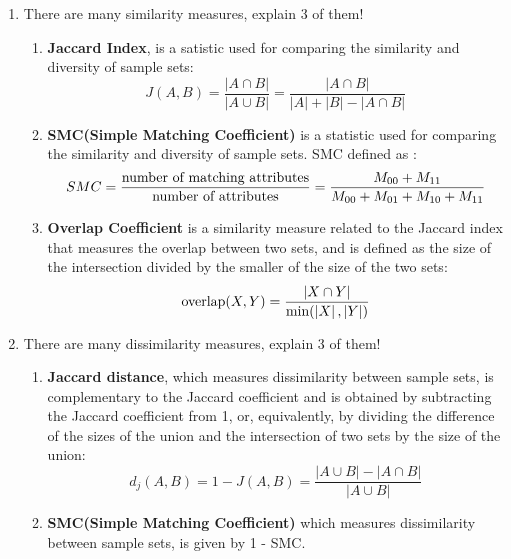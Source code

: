 \documentclass[12pt]{article}%
\begin{document}
\begin{enumerate}
	\item There are many similarity measures, explain 3 of them!
	\begin{enumerate}
		\item \textbf{Jaccard Index}, is a satistic used for comparing the similarity and diversity of sample sets:
		\begin{equation}
			J(A,B) = \frac{\left | A \cap  B \right |}{\left | A \cup B \right |} = \frac{\left | A\cap B \right |}{\left | A \right |+\left | B \right |-\left | A\cap B \right |}
		\end{equation}

		\item \textbf{SMC(Simple Matching Coefficient)} is a statistic used for comparing the similarity and diversity of sample sets. SMC defined as :
		\begin{equation}
			SMC = \frac{\textup{number of matching attributes}}{\textup{number of attributes}} = \frac{M_{00}+M_{11}}{M_{00}+M_{01}+M_{10}+M_{11}}
		\end{equation}

		\item \textbf{Overlap Coefficient} is a similarity measure related to the Jaccard index that measures the overlap between two sets, and is defined as the size of the intersection divided by the smaller of the size of the two sets:
		\begin{equation}
			\textup{overlap}(X,Y) = \frac{\left | X \cap Y \right |}{\textup{min}(\left | X \right |,\left | Y \right |)}
		\end{equation}
	\end{enumerate}

	\item There are many dissimilarity measures, explain 3 of them!
	\begin{enumerate}
		\item \textbf{Jaccard distance}, which measures dissimilarity between sample sets, is complementary to the Jaccard coefficient and is obtained by subtracting the Jaccard coefficient from 1, or, equivalently, by dividing the difference of the sizes of the union and the intersection of two sets by the size of the union: 
		\begin{equation}
			d_j(A,B) = 1 - J(A,B) = \frac{\left | A\cup B \right | - \left | A\cap B \right |}{\left | A\cup B \right |}
		\end{equation}

		\item \textbf{SMC(Simple Matching Coefficient)} which measures dissimilarity between sample sets, is given by 1 - SMC.


\end{enumerate}
\end{enumerate}
\end{document}
